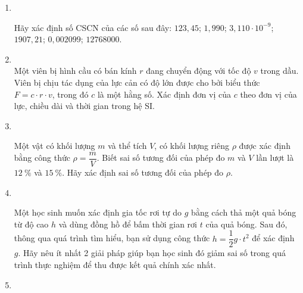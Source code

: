 \begin{enumerate}[label=\bfseries Bài \arabic*:]
\item {}\\
{Hãy xác định số CSCN của các số sau đây: $123,45$; $1,990$; $3,110\cdot 10^{-9}$; $1907,21$; $0,002099$; $12768000$. 

}
	
	\item {}\\
	{Một viên bị hình cầu có bán kính $r$ đang chuyển động với tốc độ $v$ trong dầu. Viên bị chịu tác dụng của lực cản có độ lớn được cho bởi biểu thức $F=c\cdot r\cdot v$, trong đó $c$ là một hằng số. Xác định đơn vị của $c$ theo đơn vị của lực, chiều dài và thời gian trong hệ SI.
}
	
	\item {}\\
	{Một vật có khối lượng $m$ và thể tích $V$, có khối lượng riêng $\rho$ được xác định bằng công thức $\rho =\dfrac{m}{V}$. Biết sai số tương đối của phép đo $m$ và $V$ lần lượt là $\SI{12}{\percent}$ và $\SI{15}{\percent}$. Hãy xác định sai số tương đối của phép đo $\rho$.
	
}
	
	\item {}\\
	{Một học sinh muốn xác định gia tốc rơi tự do $g$ bằng cách thả một quả bóng từ độ cao $h$ và dùng đồng hồ để bấm thời gian rơi $t$ của quả bóng. Sau đó, thông qua quá trình tìm hiểu, bạn sử dụng công thức $h=\dfrac{1}{2}g\cdot t^2$ để xác định $g$. Hãy nêu ít nhất 2 giải pháp giúp bạn học sinh đó giảm sai số trong quá trình thực nghiệm để thu được kết quả chính xác nhất.
	
}

\item {}



\end{enumerate}
